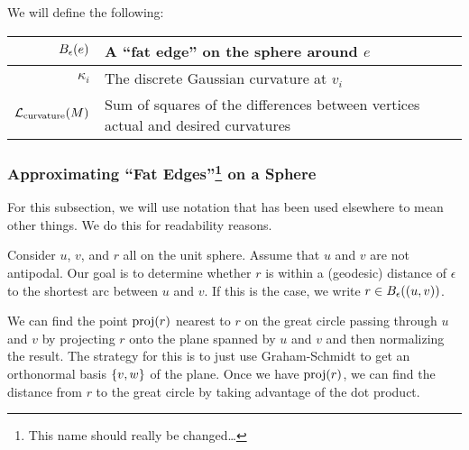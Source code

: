 We will define the following: \begin{center}\begin{tabular}{r|l}
	\(B_{\epsilon}\pof{e}\) & A ``fat edge'' on the sphere around \(e\) \\ \hline
	\(\kappa_i\) & The discrete Gaussian curvature at \(v_i\) \\ \hline
	\(\mathcal{L}_{\mathrm{curvature}}\pof{M}\) & Sum of squares of the differences between vertices actual and desired curvatures
\end{tabular}\end{center}

\subsubsection[Approximating "Fat Edges" on a Sphere]{Approximating ``Fat Edges''\footnote{This name should really be changed\dots}  on a Sphere}
For this subsection, we will use notation that has been used elsewhere to mean other things. We do this for readability reasons.

Consider \(u\), \(v\), and \(r\) all on the unit sphere. Assume that \(u\) and \(v\) are not antipodal. Our goal is to determine whether \(r\) is within a (geodesic) distance of \(\epsilon\) to the shortest arc between \(u\) and \(v\). If this is the case, we write \(r \in B_\epsilon\pof{\pof{u, v}}\).

We can find the point \(\proj\pof{r}\) nearest to \(r\) on the great circle passing through \(u\) and \(v\) by projecting \(r\) onto the plane spanned by \(u\) and \(v\) and then normalizing the result. The strategy for this is to just use Graham-Schmidt to get an orthonormal basis \(\cof{v, w}\) of the plane. Once we have \(\proj\pof{r}\), we can find the distance from \(r\) to the great circle by taking advantage of the dot product.

